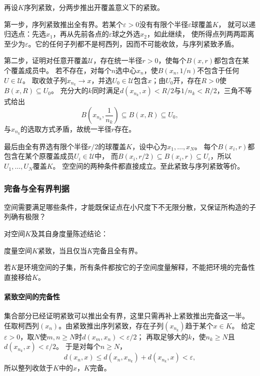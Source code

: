 再设$K$序列紧致，分两步推出开覆盖意义下的紧致。

第一步，序列紧致推出全有界。若某个$\varepsilon>0$没有有限个半径$\varepsilon$球覆盖$K$，
就可以递归选点：先选$x_1$，再从先前各点的$\varepsilon$球之外选$x_2$，如此继续，
使所得点列两两距离至少为$\varepsilon$。它的任何子列都不是柯西列，因而不可能收敛，与序列紧致矛盾。

第二步，证明对任意开覆盖$\mathcal U$，存在统一半径$r>0$，使每个$B(x,r)$都包含在某个覆盖成员中。
若不存在，对每个$n$选中心$x_n$，使$B(x_n,1/n)$不包含于任何$U\in\mathcal U$。
取收敛子列$x_{n_k}\to x$，并选$U_0\in\mathcal U$包含$x$；由$U_0$开，存在$R>0$使$B(x,R)\subseteq U_0$。
充分大的$k$同时满足$d(x_{n_k},x)<R/2$与$1/n_k<R/2$，三角不等式给出
\[
  B\!\left(x_{n_k},\frac1{n_k}\right)\subseteq B(x,R)\subseteq U_0,
\]
与$x_{n_k}$的选取方式矛盾，故统一半径$r$存在。

最后由全有界选有限个半径$r/2$的球覆盖$K$，设中心为$x_1,\ldots,x_N$。
每个$B(x_i,r)$都包含在某个原覆盖成员$U_i\in\mathcal U$中，
而$B(x_i,r/2)\subseteq B(x_i,r)\subseteq U_i$，所以$U_1,\ldots,U_N$覆盖$K$。
空空间的两种条件都直接成立。至此紧致与序列紧致等价。

\subsubsection{完备与全有界判据}
\label{sec:metric-complete-totally-bounded}

空间需要满足哪些条件，才能既保证点在小尺度下不无限分散，又保证所构造的子列确有极限？

对空间$K$及其自身度量陈述结论：
\begin{theorem}[紧致的完备且全有界判据]
\label{thm:metric-complete-totally-bounded}
度量空间$K$紧致，当且仅当$K$完备且全有界。
\end{theorem}
若$K$是环境空间的子集，所有条件都按它的子空间度量解释，不能把环境的完备性直接移给$K$。

\paragraph{紧致空间的完备性}

集合部分已经证明紧致可以推出全有界，这里只需再补上紧致推出完备这一半。
任取柯西列$(x_n)$。由紧致推出序列紧致，存在子列$(x_{n_k})$趋于某个$x\in K$。
给定$\varepsilon>0$，取$N$使$m,n\geq N$时$d(x_m,x_n)<\varepsilon/2$；
再取足够大的$k$，使$n_k\geq N$且$d(x_{n_k},x)<\varepsilon/2$。
于是对每个$n\geq N$，
\[
  d(x_n,x)\leq d(x_n,x_{n_k})+d(x_{n_k},x)<\varepsilon,
\]
所以整列收敛于$K$中的$x$，$K$完备。

